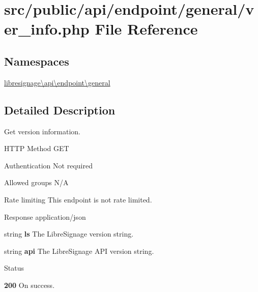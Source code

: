 \hypertarget{src_2public_2api_2endpoint_2general_2ver__info_8php}{}\section{src/public/api/endpoint/general/ver\+\_\+info.php File Reference}
\label{src_2public_2api_2endpoint_2general_2ver__info_8php}
\subsection*{Namespaces}
\begin{DoxyCompactItemize}
\item 
 \hyperlink{namespacelibresignage_1_1api_1_1endpoint_1_1general}{libresignage\textbackslash{}api\textbackslash{}endpoint\textbackslash{}general}
\end{DoxyCompactItemize}


\subsection{Detailed Description}
Get version information.

\begin{DoxyParagraph}{H\+T\+TP Method}
G\+ET 
\end{DoxyParagraph}
\begin{DoxyParagraph}{Authentication}
Not required 
\end{DoxyParagraph}
\begin{DoxyParagraph}{Allowed groups}
{\ttfamily N/A} 
\end{DoxyParagraph}
\begin{DoxyParagraph}{Rate limiting}
This endpoint is not rate limited.
\end{DoxyParagraph}
\begin{DoxyParagraph}{Response}
application/json
\begin{DoxyItemize}
\item {\ttfamily string} {\bfseries ls} The Libre\+Signage version string.
\item {\ttfamily string} {\bfseries api} The Libre\+Signage A\+PI version string.
\end{DoxyItemize}
\end{DoxyParagraph}
\begin{DoxyParagraph}{Status}

\begin{DoxyItemize}
\item {\bfseries 200} On success. 
\end{DoxyItemize}
\end{DoxyParagraph}
